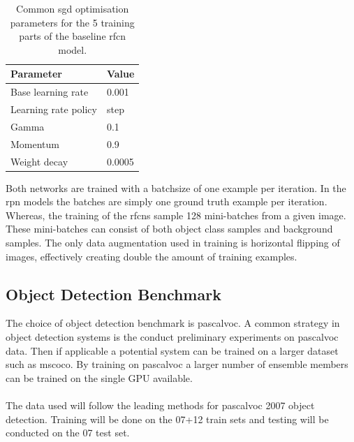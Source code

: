 \begin{table}[h]
\centering
\caption{Common \gls{sgd} optimisation parameters for the 5 training parts of the baseline \gls{rfcn} model.}
\label{tab:trainparams}
\begin{tabular}{|l|l|}
\hline
\textbf{Parameter}            & \textbf{Value}  \\ \hline
Base learning rate   & 0.001  \\ \hline
Learning rate policy & step   \\ \hline
Gamma                & 0.1    \\ \hline
Momentum             & 0.9    \\ \hline
Weight decay         & 0.0005 \\ \hline
\end{tabular}
\end{table}

 Both networks are trained with a batchsize of one example per iteration. In the \gls{rpn} models the batches are simply one ground truth example per iteration. Whereas, the training of the \glspl{rfcn} sample 128 mini-batches from a given image. These mini-batches can consist of both object class samples and background samples. 
 The only data augmentation used in training is horizontal flipping of images, effectively creating double the amount of training examples.

 \subsection{Object Detection Benchmark}
 The choice of object detection benchmark is \gls{pascalvoc}. A common strategy in object detection systems is the conduct preliminary experiments on \gls{pascalvoc} data. Then if applicable a potential system can be trained on a larger dataset such as \gls{mscoco}. By training on \gls{pascalvoc} a larger number of ensemble members can be trained on the single GPU available.
 \\\\
 The data used will follow the leading methods for \gls{pascalvoc} 2007 object detection. Training will be done on the 07+12 train sets and testing will be conducted on the 07 test set.


